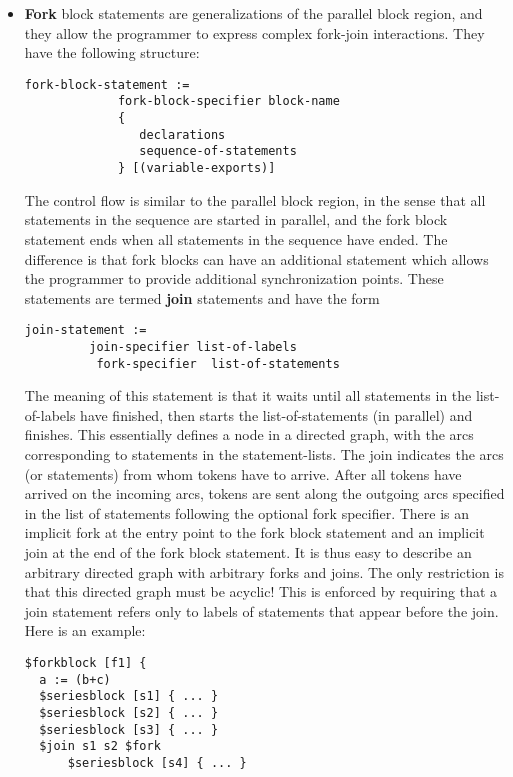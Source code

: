 \documentclass{article}
\begin{document}
\begin{itemize}
\begin{verbatim}
{
   b := a + c
   d := a - c
}
\end{verbatim} %
The two statements will start in parallel, and the block 
will finish when both have finished.  The
order in which the two statements are executed
is {\bf not} specified.
\item {\bf Fork} block statements are generalizations of the
parallel block region, and they allow the programmer to express 
complex fork-join interactions.
They have the following structure:
\begin{verbatim}
fork-block-statement :=
             fork-block-specifier block-name
             {
                declarations
                sequence-of-statements
             } [(variable-exports)]
\end{verbatim}
The control flow is similar to the parallel block region,
in the sense that all statements in the sequence are started
in parallel, and the fork block statement ends when all statements
in the sequence have ended.  The difference is that
fork blocks can have an additional statement which
allows the programmer to provide additional synchronization
points.  These statements are termed {\bf join} statements
and have the form
\begin{verbatim}
join-statement :=
         join-specifier list-of-labels 
          fork-specifier  list-of-statements
\end{verbatim}
The meaning of this statement is that it waits until all statements
in the list-of-labels have finished, then starts the list-of-statements
(in parallel) and finishes.  This essentially defines a node in a directed graph,
with the arcs corresponding to statements in the statement-lists.  
The join indicates the arcs (or statements) 
from whom tokens have to arrive.  After all tokens have arrived
on the incoming arcs, tokens are sent along the outgoing arcs specified
in the list of statements following the optional fork specifier.  There is an implicit fork
at the entry point to the fork block statement and an implicit join at the
end of the fork block statement.  It is thus easy to describe
an arbitrary directed graph with arbitrary forks and joins.  The only
restriction is that this directed graph must be acyclic!  This is enforced
by requiring that a join statement refers only to labels of statements
that appear before the join.
Here is an example:
\begin{verbatim}
$forkblock [f1] {
  a := (b+c)
  $seriesblock [s1] { ... }
  $seriesblock [s2] { ... }
  $seriesblock [s3] { ... }
  $join s1 s2 $fork 
      $seriesblock [s4] { ... }

\end{verbatim}
\end{itemize}
\end{document}
